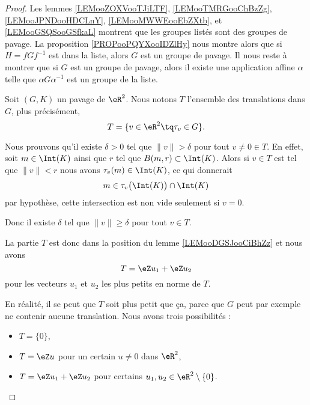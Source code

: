 \begin{proof}
	Les lemmes \ref{LEMooZOXVooTJiLTF},    \ref{LEMooTMRGooChBzZg},    \ref{LEMooJPNDooHDCLnY},    \ref{LEMooMWWEooEbZXtb}, et    \ref{LEMooGSQSooGSfkaL} montrent que les groupes listés sont des groupes de pavage. La proposition \ref{PROPooPQYXooIDZlHy} nous montre alors que si \( H=f Gf^{-1}\) est dans la liste, alors \( G\) est un groupe de pavage. Il nous reste à montrer que si \( G\) est un groupe de pavage, alors il existe une application affine \( \alpha\) telle que \( \alpha G\alpha^{-1}\) est un groupe de la liste.

	Soit \( (G,K)\) un pavage de \( \eR^2\).  Nous notons \( T\) l'ensemble des translations dans \( G\), plus précisément,
	\begin{equation}
		T=\{ v\in \eR^2\tq  \tau_v\in G\}.
	\end{equation}
	\begin{subproof}
		Nous prouvons qu'il existe \( \delta>0\) tel que \( \| v \|>\delta\) pour tout \( v\neq 0\in T\). En effet, soit \( m\in \Int(K)\) ainsi que \( r\) tel que \( B(m,r)\subset \Int(K)\). Alors si \( v\in T\) est tel que \( \| v \|<r\) nous avons \( \tau_v(m)\in \Int(K)\), ce qui donnerait
		\begin{equation}
			m\in\tau_v\big( \Int(K) \big)\cap\Int(K)
		\end{equation}
		par hypothèse, cette intersection est non vide seulement si \( v=0\).

		Donc il existe \( \delta\) tel que \( \| v \|\geq \delta\) pour tout \( v\in T\).

		La partie \( T\) est donc dans la position du lemme \ref{LEMooDGSJooCiBhZz} et nous avons
		\begin{equation}
			T=\eZ u_1+\eZ u_2
		\end{equation}
		pour les vecteurs \( u_1\) et \( u_2\) les plus petits en norme de \( T\).

		En réalité, il se peut que \( T\) soit plus petit que ça, parce que \( G\) peut par exemple ne contenir aucune translation. Nous avons trois possibilités :
		\begin{itemize}
			\item \( T=\{ 0 \}\),
			\item \( T=\eZ u\) pour un certain \( u\neq 0\) dans \( \eR^2\),
			\item \( T=\eZ u_1+\eZ u_2\) pour certains \( u_1,u_2\in \eR^2\setminus\{ 0 \}\).
		\end{itemize}


\end{subproof}
\end{proof}
